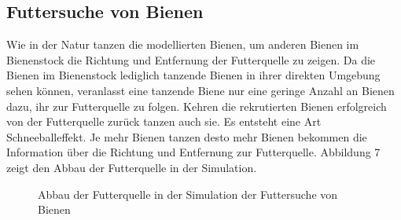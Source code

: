 \documentclass[a4paper, 11pt]{article}
\begin{document}
\subsection{Futtersuche von Bienen}
Wie in der Natur tanzen die modellierten Bienen, um anderen Bienen im Bienenstock die Richtung und Entfernung der Futterquelle zu zeigen. Da die Bienen im Bienenstock lediglich tanzende Bienen in ihrer direkten Umgebung sehen können, veranlasst eine tanzende Biene nur eine geringe Anzahl an Bienen dazu, ihr zur Futterquelle zu folgen. Kehren die rekrutierten Bienen erfolgreich von der Futterquelle zurück tanzen auch sie. Es entsteht eine Art Schneeballeffekt. Je mehr Bienen tanzen desto mehr Bienen bekommen die Information über die Richtung und Entfernung zur Futterquelle. Abbildung 7 zeigt den Abbau der Futterquelle in der Simulation.\newline
\begin{figure}[h]
	\begin{center}
	\end{center}
	\hspace{1in}\parbox{4in}{\caption[Abbau der Futterquelle in der Simulation der Futtersuche von Bienen]{Abbau der Futterquelle in der Simulation der Futtersuche von Bienen}}
	\label{bcomodabb}
\end{figure}
\newpage
\end{document}
